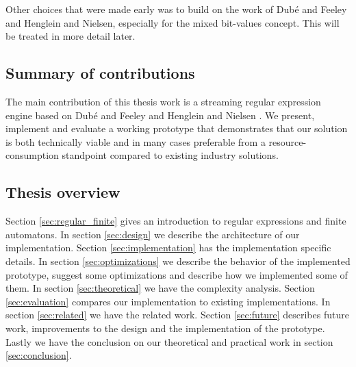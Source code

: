 Other choices that were made early was to build on the work of
Dub\'{e} and Feeley and Henglein and Nielsen, especially for the mixed
bit-values concept. This will be treated in more detail later.



\subsection{Summary of contributions}

The main contribution of this thesis work is a streaming regular
expression engine based on Dub\'{e} and Feeley \cite{Dube2000} and
Henglein and Nielsen \cite{Henglein2010}. We present, implement and
evaluate a working prototype that demonstrates that our solution is
both technically viable and in many cases preferable from a
resource-consumption standpoint compared to existing industry
solutions.

\subsection{Thesis overview}

Section \ref{sec:regular_finite} gives an introduction to regular
expressions and finite automatons. In section \ref{sec:design} we
describe the architecture of our implementation. Section
\ref{sec:implementation} has the implementation specific details. In
section \ref{sec:optimizations} we describe the behavior of the
implemented prototype, suggest some optimizations and describe how we
implemented some of them. In section \ref{sec:theoretical} we have the
complexity analysis. Section \ref{sec:evaluation} compares our
implementation to existing implementations. In section
\ref{sec:related} we have the related work. Section \ref{sec:future}
describes future work, improvements to the design and the
implementation of the prototype. Lastly we have the conclusion on our
theoretical and practical work in section \ref{sec:conclusion}.
